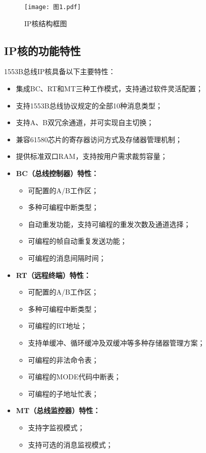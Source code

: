 \documentclass[fontset=windows]{article}
\begin{document}
\begin{figure}[htbp]
	\centering
	\texttt{[image: 图1.pdf]}
	\caption{IP核结构框图}
	\label{1}
\end{figure}

\subsection{IP核的功能特性}

1553B总线IP核具备以下主要特性：

\begin{itemize}
    \item 集成BC、RT和MT三种工作模式，支持通过软件灵活配置；
    \item 支持1553B总线协议规定的全部10种消息类型；
    \item 支持A、B双冗余通道，并可实现自主切换；
    \item 兼容61580芯片的寄存器访问方式及存储器管理机制；
    \item 提供标准双口RAM，支持按用户需求裁剪容量；
    \item \textbf{BC（总线控制器）特性：}
    \begin{itemize}
        \item 可配置的A/B工作区；
        \item 多种可编程中断类型；
        \item 自动重发功能，支持可编程的重发次数及通道选择；
        \item 可编程的帧自动重复发送功能；
        \item 可编程的消息间隔时间；
    \end{itemize}
    \item \textbf{RT（远程终端）特性：}
    \begin{itemize}
        \item 可配置的A/B工作区；
        \item 多种可编程中断类型；
        \item 可编程的RT地址；
        \item 支持单缓冲、循环缓冲及双缓冲等多种存储器管理方案；
        \item 可编程的非法命令表；
        \item 可编程的MODE代码中断表；
        \item 可编程的子地址忙表；
    \end{itemize}
    \item \textbf{MT（总线监控器）特性：}
    \begin{itemize}
        \item 支持字监视模式；
        \item 支持可选的消息监视模式；
    \end{itemize}
\end{itemize}
\end{document}
